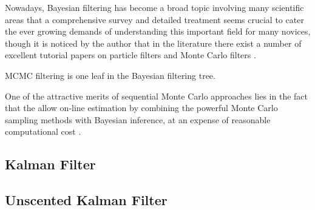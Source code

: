 Nowadays, Bayesian filtering has become a broad topic involving many scientific areas that a comprehensive survey and detailed treatment seems crucial to cater the ever growing demands of understanding this important field for many novices, though it is noticed by the author that in the literature there exist a number of excellent tutorial papers on particle filters and Monte Carlo filters \cite{chen2003bayesian} \cite{doucet2000sequential} \cite{doucet2000rao} \cite{chen2012monte}.  
 


MCMC filtering is one leaf in the Bayesian filtering tree. 


One of the attractive merits of sequential Monte Carlo approaches lies in the fact that the allow on-line estimation by combining the powerful Monte Carlo sampling methods with Bayesian inference, at an expense of reasonable computational cost \cite{chen2003bayesian}.  



\subsection*{Kalman Filter}


\subsection*{Unscented Kalman Filter}

